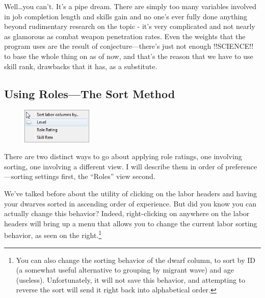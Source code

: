 \documentclass[]{article}
\begin{document}
Well\ldots you can't. It's a pipe dream. There are simply too many variables involved in job completion
length and skills gain and no one's ever fully done anything beyond rudimentary research on the topic -
it's very complicated and not nearly as glamorous as combat weapon penetration rates. Even the weights
that the program uses are the result of conjecture---there's just not enough !!SCIENCE!! to base the
whole thing on as of now, and that's the reason that we have to use skill rank, drawbacks that it has,
as a substitute.

\subsection{Using Roles---The Sort Method}
\label{sec:Using Roles}

\begin{figure}\vspace{-22pt}
  \begin{center}
    \includegraphics[width=0.3\textwidth]{Sec3Fig2}
  \end{center}
\vspace{-15pt}
\end{figure}
There are two distinct ways to go about applying role ratings, one involving sorting, one involving a
different view. I will describe them in order of preference---sorting settings first, the ``Roles'' view
second.

We've talked before about the utility of clicking on the labor headers and having your dwarves sorted in
ascending order of experience. But did you know you can actually change this behavior? Indeed,
right-clicking on anywhere on the labor headers will bring up a menu that allows you to change the
current labor sorting behavior, as seen on the right.\footnote{You can also change the sorting behavior
of the dwarf column, to sort by ID (a somewhat useful alternative to grouping by migrant wave) and age
(useless). Unfortunately, it will not save this behavior, and attempting to reverse the sort will send it
right back into alphabetical order.}
\end{document}
